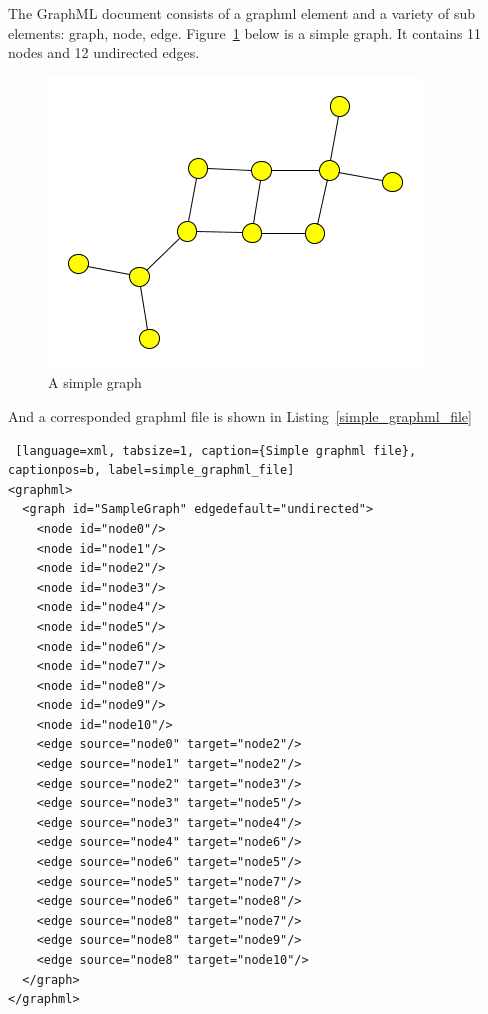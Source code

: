 The GraphML document consists of a graphml element and a variety of sub elements: graph, node, edge. Figure~\ref{fig:simple_graphml} below is a simple graph. It contains 11 nodes and 12 undirected edges.

\begin{figure}[h!]
\centering
\includegraphics[scale=1.0]{pictures/simple.png}
\caption{A simple graph}
\label{fig:simple_graphml}
\end{figure}


And a corresponded graphml file is shown in Listing~\ref{simple_graphml_file}

\begin{center}
\renewcommand{\thelstlisting}{\thesection.\arabic{lstlisting}}
\begin{lstlisting} [language=xml, tabsize=1, caption={Simple graphml file}, captionpos=b, label=simple_graphml_file]
<graphml>
  <graph id="SampleGraph" edgedefault="undirected">
    <node id="node0"/>
    <node id="node1"/>
    <node id="node2"/>
    <node id="node3"/>
    <node id="node4"/>
    <node id="node5"/>
    <node id="node6"/>
    <node id="node7"/>
    <node id="node8"/>
    <node id="node9"/>
    <node id="node10"/>
    <edge source="node0" target="node2"/>
    <edge source="node1" target="node2"/>
    <edge source="node2" target="node3"/>
    <edge source="node3" target="node5"/>
    <edge source="node3" target="node4"/>
    <edge source="node4" target="node6"/>
    <edge source="node6" target="node5"/>
    <edge source="node5" target="node7"/>
    <edge source="node6" target="node8"/>
    <edge source="node8" target="node7"/>
    <edge source="node8" target="node9"/>
    <edge source="node8" target="node10"/>
  </graph>
</graphml>
\end{lstlisting}
\end{center}

